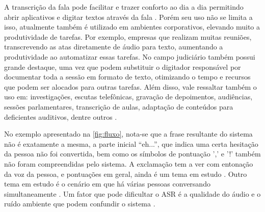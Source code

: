 

A transcrição da fala pode facilitar e trazer conforto ao dia a dia permitindo abrir aplicativos e digitar textos através da fala  \cite{litero}. Porém seu uso não se limita a isso, atualmente também é utilizado em ambientes corporativos, elevando muito a produtividade de tarefas. Por exemplo, empresas que realizam muitas reuniões, transcrevendo as atas diretamente de áudio para texto, aumentando a produtividade ao automatizar essas tarefas. No campo judiciário também possui grande destaque, uma vez que podem substituir o digitador responsável por documentar toda a sessão em formato de texto, otimizando o tempo e recursos que podem ser alocados para outras tarefas. Além disso, vale ressaltar também o uso em: investigações, escutas telefônicas, gravação de depoimentos, audiências, sessões parlamentares, transcrição de aulas, adaptação de conteúdos para deficientes auditivos,  dentre outros \cite{computerworld}. 


No exemplo apresentado na \autoref{fig:fluxo}, nota-se que a frase resultante do sistema não é exatamente a mesma, a parte inicial ``eh...'', que indica uma certa hesitação da pessoa não foi convertida, bem como os símbolos de pontuação ',' e '!' também não foram compreendidas pelo sistema. A exclamação tem a ver com entonação da voz da pessoa, e pontuações em geral, ainda é um tema em estudo \cite{zelasko2018punctuation}. Outro tema em estudo é o cenário em que há várias pessoas conversando simultaneamente \cite{sudoh2020simultaneous}. Um fator que pode dificultar o ASR é a qualidade do áudio e o ruído ambiente que podem confundir o sistema \cite{sharan2016overview}. 

